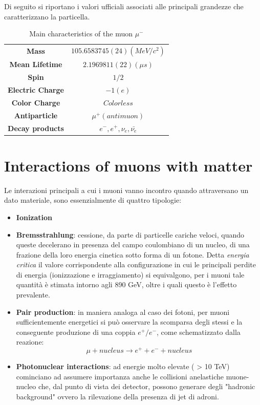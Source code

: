 \documentclass[a4paper,11pt]{book}
\begin{document}
Di seguito si riportano i valori ufficiali associati alle principali grandezze che caratterizzano la particella.\\


\begin{table}[htbp]
\centering
\begin{tabular}{c c}
\textbf{Mass} & $105.6583745(24) (MeV/c^2)$\\
\textbf{Mean Lifetime} & $2.1969811(22) (\mu s)$\\
\textbf{Spin} & $1/2$\\
\textbf{Electric Charge} & $-1 (e)$\\
\textbf{Color Charge} & $Colorless$\\
\textbf{Antiparticle} & $\mu^+ (antimuon)$\\
\textbf{Decay products} & $e^-,e^+,\nu_e,\bar{\nu_e}$\\
\end{tabular}
\caption{Main characteristics of the muon $\mu^-$}
\label{tab:muon_parameters}
\end{table}


\section{Interactions of muons with matter}

Le interazioni principali a cui i muoni vanno incontro quando attraversano un dato materiale, sono essenzialmente di quattro tipologie: 
\begin{itemize}
\item \textbf{Ionization}
\item \textbf{Bremsstrahlung}: cessione, da parte di particelle cariche veloci, quando queste decelerano in presenza del campo coulombiano di un nucleo, di una frazione della loro energia cinetica sotto forma di un fotone. Detta \textit{energia critica} il valore corrispondente alla configurazione in cui le principali perdite di energia (ionizzazione e irraggiamento) si equivalgono, per i muoni tale quantità è stimata intorno agli 890 GeV, oltre i quali questo è l'effetto prevalente.
\item \textbf{Pair production}: in maniera analoga al caso dei fotoni, per muoni sufficientemente energetici si può osservare la scomparsa degli stessi e la conseguente produzione di una coppia $e^+/e^-$, come schematizzato dalla reazione:
\[ \mu + nucleus \to e^+ + e^- + nucleus \]
\item \textbf{Photonuclear interactions}: ad energie molto elevate ( > 10 TeV) cominciano ad assumere importanza anche le collisioni anelastiche muone-nucleo che, dal punto di vista dei detector, possono generare degli "hadronic background" ovvero la rilevazione della presenza di jet di adroni.
\end{itemize}
\end{document}
